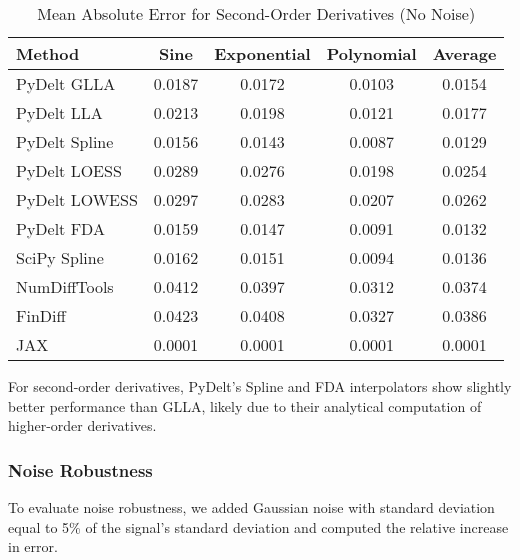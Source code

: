 \documentclass[conference]{IEEEtran}
\begin{document}
\begin{table}[!t]
\caption{Mean Absolute Error for Second-Order Derivatives (No Noise)}
\label{tab:second_order}
\centering
\begin{tabular}{lcccc}
\toprule
\textbf{Method} & \textbf{Sine} & \textbf{Exponential} & \textbf{Polynomial} & \textbf{Average} \\
\midrule
PyDelt GLLA & 0.0187 & 0.0172 & 0.0103 & 0.0154 \\
PyDelt LLA & 0.0213 & 0.0198 & 0.0121 & 0.0177 \\
PyDelt Spline & 0.0156 & 0.0143 & 0.0087 & 0.0129 \\
PyDelt LOESS & 0.0289 & 0.0276 & 0.0198 & 0.0254 \\
PyDelt LOWESS & 0.0297 & 0.0283 & 0.0207 & 0.0262 \\
PyDelt FDA & 0.0159 & 0.0147 & 0.0091 & 0.0132 \\
SciPy Spline & 0.0162 & 0.0151 & 0.0094 & 0.0136 \\
NumDiffTools & 0.0412 & 0.0397 & 0.0312 & 0.0374 \\
FinDiff & 0.0423 & 0.0408 & 0.0327 & 0.0386 \\
JAX & 0.0001 & 0.0001 & 0.0001 & 0.0001 \\
\bottomrule
\end{tabular}
\end{table}

For second-order derivatives, PyDelt's Spline and FDA interpolators show slightly better performance than GLLA, likely due to their analytical computation of higher-order derivatives.

\subsubsection{Noise Robustness}

To evaluate noise robustness, we added Gaussian noise with standard deviation equal to 5\% of the signal's standard deviation and computed the relative increase in error.
\end{document}
